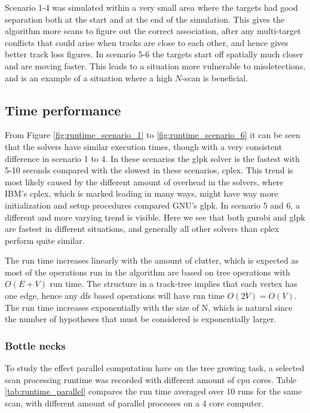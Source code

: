 Scenario 1-4 was simulated within a very small area where the targets had good separation both at the start and at the end of the simulation. This gives the algorithm more \glspl{scan} to figure out the correct association, after any multi-target conflicts that could arise when tracks are close to each other, and hence gives better track loss figures. In scenario 5-6 the targets start off spatially much closer and are moving faster. This leads to a situation more vulnerable to misdetections, and is an example of a situation where a high $N$-scan is beneficial.

\subsection{Time performance}
From Figure \ref{fig:runtime_scenario_1} to \ref{fig:runtime_scenario_6} it can be seen that the solvers have similar execution times, though with a very consistent difference in scenario 1 to 4. In these scenarios the \gls{glpk} solver is the fastest with 5-10 seconds compared with the slowest in these scenarios, \gls{cplex}. This trend is most likely caused by the different amount of overhead in the solvers, where IBM's \gls{cplex}, which is marked leading in many ways, might have way more initialization and setup procedures compared GNU's \gls{glpk}. In scenario 5 and 6, a different and more varying trend is visible. Here we see that both \gls{gurobi} and \gls{glpk} are fastest in different situations, and generally all other solvers than \gls{cplex} perform quite similar.

The run time increases linearly with the amount of clutter, which is expected as most of the operations run in the algorithm are based on tree operations with $O(E+V)$ run time. The structure in a track-tree implies that each vertex has one edge, hence any \gls{dfs} based operations will have run time  $O(2V)=O(V)$. The run time increases exponentially with the size of N, which is natural since the number of hypotheses that must be considered is exponentially larger.

\subsubsection{Bottle necks}
To study the effect parallel computation have on the tree growing task, a selected scan processing runtime was recorded with different amount of \gls{cpu} cores. Table \ref{tab:runtime_parallel} compares the run time averaged over 10 runs for the same scan, with different amount of parallel processes on a 4 core computer.

